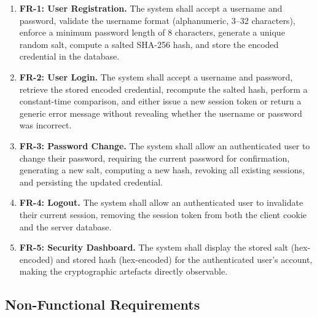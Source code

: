 \begin{enumerate}
  \item \textbf{FR-1: User Registration.} The system shall accept a username and password, validate the username format (alphanumeric, 3--32 characters), enforce a minimum password length of 8 characters, generate a unique random salt, compute a salted SHA-256 hash, and store the encoded credential in the database.

  \item \textbf{FR-2: User Login.} The system shall accept a username and password, retrieve the stored encoded credential, recompute the salted hash, perform a constant-time comparison, and either issue a new session token or return a generic error message without revealing whether the username or password was incorrect.

  \item \textbf{FR-3: Password Change.} The system shall allow an authenticated user to change their password, requiring the current password for confirmation, generating a new salt, computing a new hash, revoking all existing sessions, and persisting the updated credential.

  \item \textbf{FR-4: Logout.} The system shall allow an authenticated user to invalidate their current session, removing the session token from both the client cookie and the server database.

  \item \textbf{FR-5: Security Dashboard.} The system shall display the stored salt (hex-encoded) and stored hash (hex-encoded) for the authenticated user's account, making the cryptographic artefacts directly observable.
\end{enumerate}

\subsection{Non-Functional Requirements}
\label{sec:theory_nonfunc_req}

